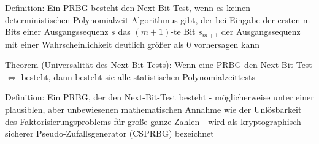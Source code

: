 \documentclass[a4paper]{article}
\begin{document}
\begin{multicols}{3}
\begin{itemize*}
            \item Definition: Ein PRBG besteht den Next-Bit-Test, wenn es keinen deterministischen Polynomialzeit-Algorithmus gibt, der bei Eingabe der ersten m Bits einer Ausgangssequenz $s$ das $(m+1)$-te Bit $s_{m+1}$ der Ausgangssequenz mit einer Wahrscheinlichkeit deutlich größer als 0 vorhersagen kann
            \item Theorem (Universalität des Next-Bit-Tests): Wenn eine PRBG den Next-Bit-Test $\Leftrightarrow$ besteht, dann besteht sie alle statistischen Polynomialzeittests
            \item Definition: Ein PRBG, der den Next-Bit-Test besteht - möglicherweise unter einer plausiblen, aber unbewiesenen mathematischen Annahme wie der Unlösbarkeit des Faktorisierungsproblems für große ganze Zahlen - wird als kryptographisch sicherer Pseudo-Zufallsgenerator (CSPRBG) bezeichnet
      \end{itemize*}


\end{multicols}
\end{document}
